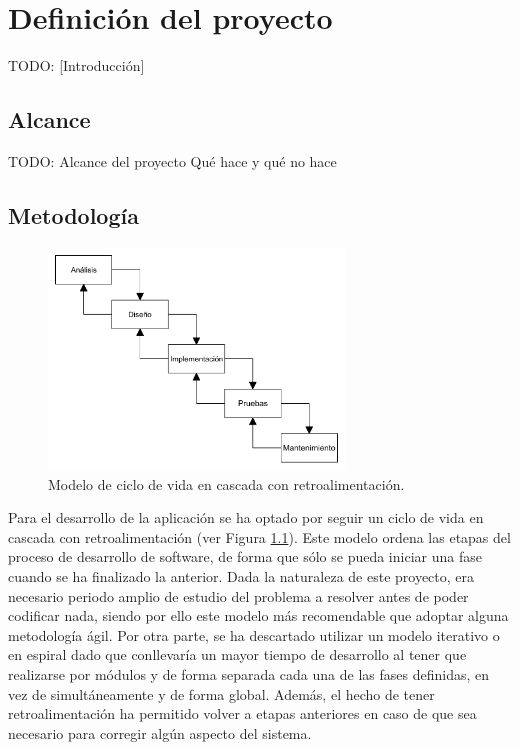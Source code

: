 \chapter{Definición del proyecto\label{cap:defProyecto}}

TODO: [Introducción]

\section{Alcance\label{sec:dp:alcance}}

TODO: Alcance del proyecto
Qué hace y qué no hace


\section{Metodología\label{sec:dp:metodologia}}

\begin{figure}[!htp]
  \centering
  \includegraphics[width=0.7\textwidth,clip=true]{graphics/cascada_retroalimentacion}
  \caption{Modelo de ciclo de vida en cascada con retroalimentación.}
  \label{fig:cascada}
\end{figure}

Para el desarrollo de la aplicación se ha optado por seguir un ciclo de vida en cascada con retroalimentación (ver Figura \ref{fig:cascada}).
Este modelo ordena las etapas del proceso de desarrollo de software, de forma que sólo se pueda iniciar una fase cuando se ha finalizado la anterior.
Dada la naturaleza de este proyecto, era necesario periodo amplio de estudio del problema a resolver antes de poder codificar nada, siendo por ello este modelo más recomendable que adoptar alguna metodología ágil.
Por otra parte, se ha descartado utilizar un modelo iterativo o en espiral dado que conllevaría un mayor tiempo de desarrollo al tener que realizarse por módulos y de forma separada cada una de las fases definidas, en vez de simultáneamente y de forma global.
Además, el hecho de tener retroalimentación ha permitido volver a etapas anteriores en caso de que sea necesario para corregir algún aspecto del sistema.

